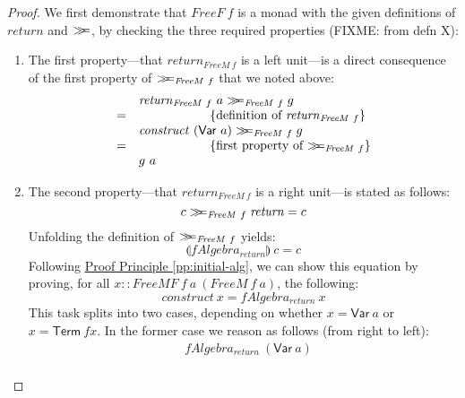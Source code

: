 \documentclass{jfp1}
\newcommand{\fold}[1]{\llparenthesis #1 \rrparenthesis}
\newcommand{\mbind}{\mathrel{>\kern-0.45em>\kern-0.45em=}}
\newcommand{\eqAnnotation}[1]{\hspace{2cm}\left\{\textrm{#1}\right\}}
\newcommand{\proofprinref}[1]{\hyperref[#1]{Proof Principle \ref*{#1}}}
\begin{document}
\begin{proof}
  We first demonstrate that $\mathit{FreeF}~f$ is a monad with the
  given definitions of $\mathit{return}$ and $\mbind$, by checking the
  three required properties (FIXME: from defn X):
  \begin{enumerate}
  \item The first property---that $\mathit{return}_{\mathit{FreeM}~f}$
    is a left unit---is a direct consequence of the first property of
    $\mbind_{\mathit{FreeM}~f}$ that we noted above:
    \begin{displaymath}
      \begin{array}{cl}
        & \mathit{return}_{\mathit{FreeM}~f}~a \mbind_{\mathit{FreeM}~f} g \\
        =&\eqAnnotation{definition of $\mathit{return}_{\mathit{FreeM}~f}$} \\
        & \mathit{construct}~(\mathsf{Var}~a) \mbind_{\mathit{FreeM}~f} g \\
        =&\eqAnnotation{first property of $\mbind_{\mathit{FreeM}~f}$} \\
        & g~a
      \end{array}
    \end{displaymath}
  \item The second property---that
    $\mathit{return}_{\mathit{FreeM}~f}$ is a right unit---is stated
    as follows:
    \begin{displaymath}
      c \mbind_{\mathit{FreeM}~f} \mathit{return} = c
    \end{displaymath}
    Unfolding the definition of $\mbind_{\mathit{FreeM}~f}$ yields:
    \begin{displaymath}
      \fold{\mathit{fAlgebra_{return}}}~c = c
    \end{displaymath}
    Following \proofprinref{pp:initial-alg}, we can show this equation
    by proving, for all $x ::
    \mathit{FreeMF}~f~a~(\mathit{FreeM}~f~a)$, the following:
    \begin{displaymath}
      \mathit{construct}~x = \mathit{fAlgebra_{return}}~x
    \end{displaymath}
    This task splits into two cases, depending on whether $x =
    \mathsf{Var}~a$ or $x =\mathsf{Term}~\mathit{fx}$. In the former
    case we reason as follows (from right to left):
    \begin{displaymath}
      \begin{array}{cl}
        & \mathit{fAlgebra_{return}}~(\mathsf{Var}~a) \\

\end{array}
\end{displaymath}
\end{enumerate}
\end{proof}
\end{document}
